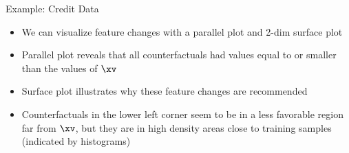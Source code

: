 \documentclass[11pt,compress,t,notes=noshow, aspectratio=169, xcolor=table]{beamer}
\begin{document}
\begin{frame}{Example: Credit Data }
\begin{itemize}
	\item<1-> We can visualize feature changes with a parallel plot and 2-dim surface plot
		\item<1-> Parallel plot reveals that all counterfactuals had values equal to or smaller than the values of $\xv$
		\item<2-> Surface plot illustrates why these feature changes are recommended 
		\item<2-> Counterfactuals in the lower left corner seem to be in a less favorable region far from $\xv$, but they are in high density areas close to training samples (indicated by histograms)
	\end{itemize}
	\begin{columns}
	\end{columns}
\end{frame}
\end{document}
